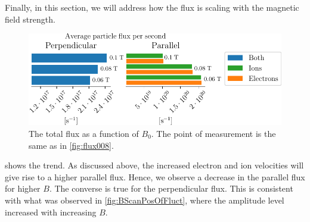 Finally, in this section, we will address how the flux is scaling with the magnetic field strength.
%
\begin{figure}[htb]
    \centering
    \includegraphics{fig/results/bScan/BScanTotalFlux}
    \caption{
        The total flux as a function of $B_0$.
        The point of measurement is the same as in \cref{fig:flux008}.
    }
    \label{fig:BScanTotalFlux}
\end{figure}
%
 shows the trend.
As discussed above, the increased electron and ion velocities will give rise to a higher parallel flux.
Hence, we observe a decrease in the parallel flux for higher $B$.
The converse is true for the perpendicular flux.
This is consistent with what was observed in \cref{fig:BScanPosOfFluct}, where the amplitude level increased with increasing $B$.
